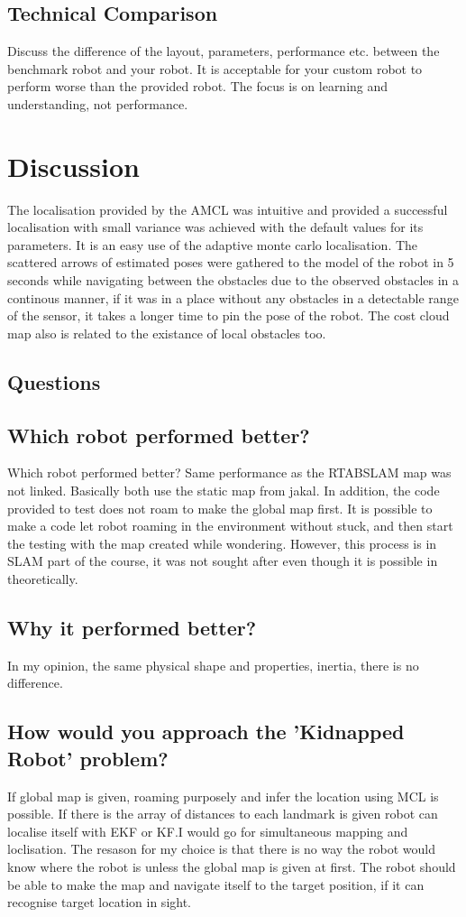\documentclass[10pt,journal,compsoc]{IEEEtran}
\begin{document}
\subsection{Technical Comparison} %
Discuss the difference of the layout, parameters, performance etc. between the benchmark robot and your robot. It is acceptable for your custom robot to perform worse than the provided robot. The focus is on learning and understanding, not performance. 

\section{Discussion}

The localisation provided by the AMCL was intuitive and provided a successful localisation with small variance was achieved with the default values for its parameters. It is an easy use of the adaptive monte carlo localisation. The scattered arrows of estimated poses were gathered to the model of the robot in 5 seconds while navigating between the obstacles due to the observed obstacles in a continous manner, if it was in a place without any obstacles in a detectable range of the sensor, it takes a longer time to pin the pose of the robot. The cost cloud map also is related to the existance of local obstacles too.


\subsection{Questions}
\subsection{Which robot performed better?}
Which robot performed better? Same performance as the RTABSLAM map was not linked. Basically both use the static map from jakal. 
In addition, the code provided to test does not roam to make the global map first. It is possible to make a code let robot roaming in the environment without stuck, and then start the testing with the map created while wondering. However, this process is in SLAM part of the course, it was not sought after even though it is possible in theoretically.
\subsection{Why it performed better?}
In my opinion, the same physical shape and properties, inertia, there is no difference.
\subsection{How would you approach the 'Kidnapped Robot' problem?}
If global map is given, roaming purposely and infer the location using MCL is possible. If there is the array of distances to each landmark is given robot can localise itself with EKF or KF.I would go for simultaneous mapping and loclisation. The resason for my choice is that there is no way the robot would know where the robot is unless the global map is given at first. The robot should be able to make the map and navigate itself to the target position, if it can recognise target location in sight. 
\end{document}
